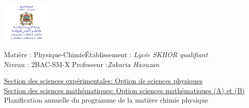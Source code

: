 \documentclass[12pt]{article}
\newcommand\headerMe[2]{\noindent{}#1\hfill#2}
\begin{document}
\begin{center}
\includegraphics[width = 0.18\textwidth]{./img/logoMin.png}
\vspace{-3cm}
\end{center}
\headerMe{Matière : Physique-Chimie}{Établissement : \emph{Lycée SKHOR qualifiant}}\\
\headerMe{ Niveau : 2BAC-SM-X }{  Professeur :\emph{Zakaria Haouzan}}\\

\begin{center}
	\vspace{0.5cm}
\underline{Section des sciences expérimentales: Option de sciences physiques}\\
\underline{Section des sciences mathématiques: Option sciences mathématiques (A) et (B)}
\\
\hrulefill
\Large{Planification annuelle
du programme de la matière chimie physique}
\hrulefill\\
\end{center}
\end{document}
